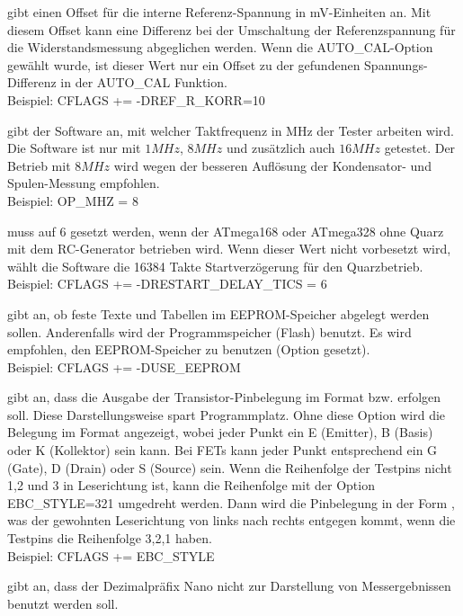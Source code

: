 \begin{description} \setlength{\itemsep}{0em}
  \item[REF\_R\_KORR] gibt einen Offset für die interne Referenz-Spannung in mV-Einheiten an.
Mit diesem Offset kann eine Differenz bei der Umschaltung der Referenzspannung für die Widerstandsmessung abgeglichen werden.
Wenn die AUTO\_CAL-Option gewählt wurde, ist dieser Wert nur ein Offset zu der gefundenen Spannungs-Differenz in der
AUTO\_CAL Funktion.\\
Beispiel: CFLAGS += -DREF\_R\_KORR=10
  \item[OP\_MHZ] gibt der Software an, mit welcher Taktfrequenz in MHz der Tester arbeiten wird.
Die Software ist nur mit \(1MHz\), \(8MHz\) und zusätzlich auch \(16MHz\) getestet. Der Betrieb mit \(8MHz\) wird wegen der besseren Auflösung der
Kondensator- und Spulen-Messung empfohlen.\\
Beispiel: OP\_MHZ = 8
  \item[RESTART\_DELAY\_TICS] muss auf 6 gesetzt werden, wenn der ATmega168 oder ATmega328 ohne Quarz mit dem
RC-Generator betrieben wird. Wenn dieser Wert nicht vorbesetzt wird, wählt die Software die 16384 Takte Startverzögerung für
den Quarzbetrieb.\\
Beispiel: CFLAGS += -DRESTART\_DELAY\_TICS = 6
  \item[USE\_EEPROM] gibt an, ob feste Texte und Tabellen im EEPROM-Speicher abgelegt werden sollen.
Anderenfalls wird der Programmspeicher (Flash) benutzt.
Es wird empfohlen, den EEPROM-Speicher zu benutzen (Option gesetzt).\\
Beispiel: CFLAGS += -DUSE\_EEPROM
  \item[EBC\_STYLE] gibt an, dass die Ausgabe der Transistor-Pinbelegung im Format  bzw.  erfolgen soll.
  Diese Darstellungsweise spart Programmplatz. Ohne diese Option wird die Belegung im Format  angezeigt, wobei
jeder Punkt ein E (Emitter), B (Basis) oder K (Kollektor) sein kann.
Bei FETs kann jeder Punkt entsprechend ein G (Gate), D (Drain) oder S (Source) sein.
Wenn die Reihenfolge der Testpins nicht 1,2 und 3 in Leserichtung ist, kann die Reihenfolge mit der Option EBC\_STYLE=321 
umgedreht werden. Dann wird die Pinbelegung in der Form , was der gewohnten Leserichtung von links nach rechts
entgegen kommt, wenn die Testpins die Reihenfolge 3,2,1 haben.\\
Beispiel: CFLAGS += EBC\_STYLE
  \item[NO\_NANO] gibt an, dass der Dezimalpräfix Nano nicht zur Darstellung von Messergebnissen benutzt werden soll.

\end{description}
